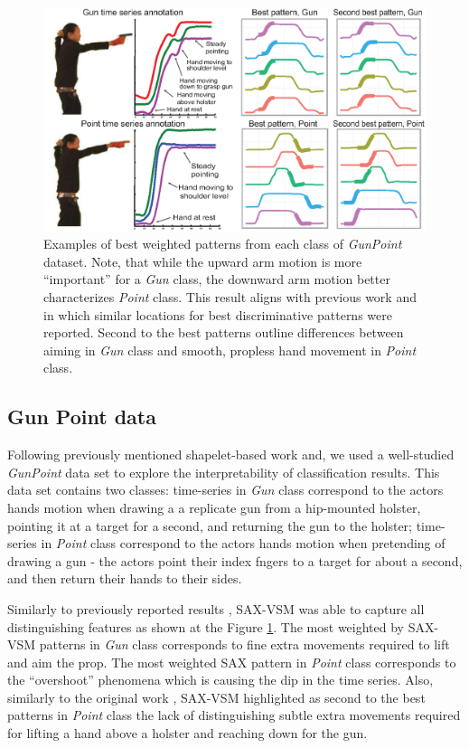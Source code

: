 \documentclass{llncs}
\newcommand{\myfigureshrinker}{\vspace{-1cm}}
\begin{document}
\begin{figure}[t]
   \myfigureshrinker
   \centering
   \includegraphics[width=120mm]{figures/gun-point.eps}
   \caption{Examples of best weighted patterns from each class of \textit{GunPoint} dataset. 
   Note, that while the upward arm motion is more ``important'' for a \textit{Gun} class, 
   the downward arm motion better characterizes \textit{Point} class. 
   This result aligns with previous work \cite{shapelet} and \cite{bagnal} in which similar 
   locations for best discriminative patterns were reported. 
   Second to the best patterns outline differences between aiming in \textit{Gun} class and
   smooth, propless hand movement in \textit{Point} class.
   }
   \label{fig:shapelet-like-patterns}
\end{figure}

\subsection{Gun Point data}
Following previously mentioned shapelet-based work \cite{shapelet} and\cite{bagnal}, 
we used a well-studied \textit{GunPoint} data set \cite{gun} to explore the 
interpretability of classification results. This data set contains two classes: 
time-series in \textit{Gun} class correspond to the actors hands motion when drawing a 
a replicate gun from a hip-mounted holster, pointing it at a target for a second,
and returning the gun to the holster; 
time-series in \textit{Point} class correspond to the actors hands motion when pretending
of drawing a gun - the actors point their index fngers to a target for about a second, 
and then return their hands to their sides. 

Similarly to previously reported results \cite{shapelet} \cite{bagnal}, 
SAX-VSM was able to capture all distinguishing features as shown at the 
Figure \ref{fig:shapelet-like-patterns}. The most weighted by SAX-VSM patterns in 
\textit{Gun} class corresponds to fine extra movements required to lift and aim the prop. 
The most weighted SAX pattern in \textit{Point} class corresponds to the ``overshoot''
phenomena which is causing the dip in the time series. 
Also, similarly to the original work \cite{gun}, SAX-VSM highlighted as second to the best
patterns in \textit{Point} class the lack of distinguishing subtle extra movements required
for lifting a hand above a holster and reaching down for the gun.
\end{document}
